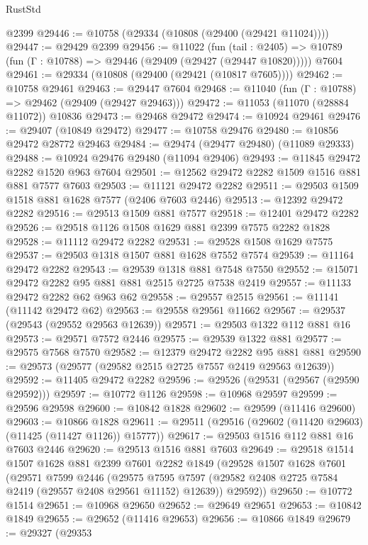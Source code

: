 \begin{lexlean}{RustStd}
\begin{coremodule}
    @2399
@29446 := @10758 (@29334 (@10808 (@29400 (@29421 @11024))))
@29447 := @29429 @2399
@29456 := @11022
    (fun (tail : @2405) => @10789 (fun (Γ : @10788) => @29446 (@29409 (@29427 (@29447 @10820)))))
    @7604
@29461 := @29334 (@10808 (@29400 (@29421 (@10817 @7605))))
@29462 := @10758 @29461
@29463 := @29447 @7604
@29468 := @11040 (fun (Γ : @10788) => @29462 (@29409 (@29427 @29463)))
@29472 := @11053 (@11070 (@28884 @11072)) @10836
@29473 := @29468 @29472
@29474 := @10924 @29461
@29476 := @29407 (@10849 @29472)
@29477 := @10758 @29476
@29480 := @10856 @29472 @28772 @29463
@29484 := @29474 (@29477 @29480) (@11089 @29333)
@29488 := @10924 @29476 @29480 (@11094 @29406)
@29493 := @11845 @29472 @2282 @1520 @963 @7604
@29501 := @12562 @29472 @2282 @1509 @1516 @881 @881 @7577 @7603
@29503 := @11121 @29472 @2282
@29511 := @29503 @1509 @1518 @881 @1628 @7577 (@2406 @7603 @2446)
@29513 := @12392 @29472 @2282
@29516 := @29513 @1509 @881 @7577
@29518 := @12401 @29472 @2282
@29526 := @29518 @1126 @1508 @1629 @881 @2399 @7575 @2282 @1828
@29528 := @11112 @29472 @2282
@29531 := @29528 @1508 @1629 @7575
@29537 := @29503 @1318 @1507 @881 @1628 @7552 @7574
@29539 := @11164 @29472 @2282
@29543 := @29539 @1318 @881 @7548 @7550
@29552 := @15071 @29472 @2282 @95 @881 @881 @2515 @2725 @7538 @2419
@29557 := @11133 @29472 @2282 @62 @963 @62
@29558 := @29557 @2515
@29561 := @11141 (@11142 @29472 @62)
@29563 := @29558 @29561 @11662
@29567 := @29537 (@29543 (@29552 @29563 @12639))
@29571 := @29503 @1322 @112 @881 @16
@29573 := @29571 @7572 @2446
@29575 := @29539 @1322 @881
@29577 := @29575 @7568 @7570
@29582 := @12379 @29472 @2282 @95 @881 @881
@29590 := @29573 (@29577 (@29582 @2515 @2725 @7557 @2419 @29563 @12639))
@29592 := @11405 @29472 @2282
@29596 := @29526 (@29531 (@29567 (@29590 @29592)))
@29597 := @10772 @1126
@29598 := @10968 @29597
@29599 := @29596 @29598
@29600 := @10842 @1828
@29602 := @29599 (@11416 @29600)
@29603 := @10866 @1828
@29611 := @29511 (@29516 (@29602 (@11420 @29603) (@11425 (@11427 @1126)) @15777))
@29617 := @29503 @1516 @112 @881 @16 @7603 @2446
@29620 := @29513 @1516 @881 @7603
@29649 := @29518
    @1514
    @1507
    @1628
    @881
    @2399
    @7601
    @2282
    @1849
    (@29528
      @1507
      @1628
      @7601
      (@29571
        @7599
        @2446
        (@29575 @7595 @7597 (@29582 @2408 @2725 @7584 @2419 (@29557 @2408 @29561 @11152) @12639))
        @29592))
@29650 := @10772 @1514
@29651 := @10968 @29650
@29652 := @29649 @29651
@29653 := @10842 @1849
@29655 := @29652 (@11416 @29653)
@29656 := @10866 @1849
@29679 := @29327
    (@29353

\end{coremodule}
\end{lexlean}

